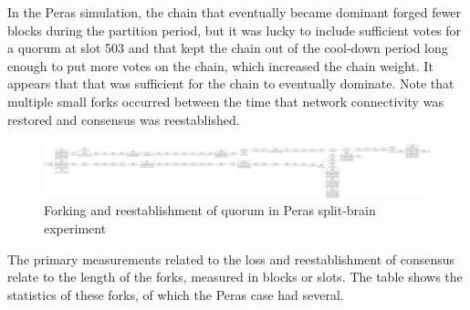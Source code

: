 \documentclass[10pt]{article}
\begin{document}
In the Peras simulation, the chain that eventually became dominant
forged fewer blocks during the partition period, but it was lucky to
include sufficient votes for a quorum at slot 503 and that kept the
chain out of the cool-down period long enough to put more votes on the
chain, which increased the chain weight. It appears that that was
sufficient for the chain to eventually dominate. Note that multiple
small forks occurred between the time that network connectivity was
restored and consensus was reestablished.

\begin{figure}
\centering
\includegraphics{../diagrams/sim-expts/split-brain.png}
\caption{Forking and reestablishment of quorum in Peras split-brain
experiment}
\end{figure}

The primary measurements related to the loss and reestablishment of
consensus relate to the length of the forks, measured in blocks or
slots. The table shows the statistics of these forks, of which the Peras
case had several.
\end{document}
